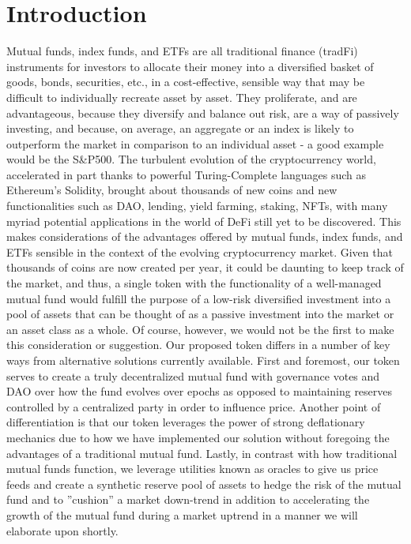 \documentclass[letterpaper,11pt]{article}
\begin{document}
\section{Introduction}
Mutual funds, index funds, and ETFs are all traditional finance (tradFi) instruments for investors to allocate their money into a diversified basket of goods, bonds, securities, etc., in a cost-effective, sensible way that may be difficult to individually recreate asset by asset. They proliferate, and are advantageous, because they diversify and balance out risk, are a way of passively investing, and because, on average, an aggregate or an index is likely to outperform the market in comparison to an individual asset - a good example would be the S\&P500. The turbulent evolution of the cryptocurrency world, accelerated in part thanks to powerful Turing-Complete languages such as Ethereum’s Solidity, brought about thousands of new coins and new functionalities such as DAO, lending, yield farming, staking, NFTs, with many myriad potential applications in the world of DeFi still yet to be discovered. This makes considerations of the advantages offered by mutual funds, index funds, and ETFs sensible in the context of the evolving cryptocurrency market. Given that thousands of coins are now created per year, it could be daunting to keep track of the market, and thus, a single token with the functionality of a well-managed mutual fund would fulfill the purpose of a low-risk diversified investment into a pool of assets that can be thought of as a passive investment into the market or an asset class as a whole. Of course, however, we would not be the first to make this consideration or suggestion. Our proposed token differs in a number of key ways from alternative solutions currently available. First and foremost, our token serves to create a truly decentralized mutual fund with governance votes and DAO over how the fund evolves over epochs as opposed to maintaining reserves controlled by a centralized party in order to influence price. Another point of differentiation is that our token leverages the power of strong deflationary mechanics due to how we have implemented our solution without foregoing the advantages of a traditional mutual fund. Lastly, in contrast with how traditional mutual funds function, we leverage utilities known as oracles to give us price feeds and create a synthetic reserve pool of assets to hedge the risk of the mutual fund and to ”cushion” a market down-trend in addition to accelerating the growth of the mutual fund during a market uptrend in a manner we will elaborate upon shortly.
\end{document}
